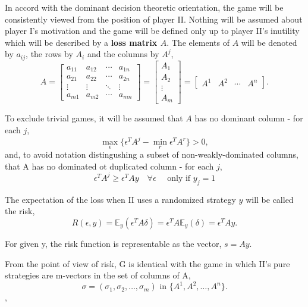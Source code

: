 \documentclass[11pt]{article}
\theoremstyle{boldStyle}
\begin{document}
In accord with the dominant decision theoretic orientation, the game will be consistently viewed from the position of player II. 
Nothing will be assumed about player I's motivation and the game will be defined only up to player II's inutility which will be described by a \textbf{loss matrix $A$}. 
The elements of $A$ will be denoted by $a_{ij}$, the rows by $A_i$ and the columns by $A^j$,
\begin{equation} \label{eq:3}
    A = \begin{bmatrix}
    a_{11} & a_{12} & \cdots & a_{1n} \\
    a_{21} & a_{22} & \cdots & a_{2n} \\
    \vdots & \vdots & \ddots & \vdots \\
    a_{m1} & a_{m2} & \cdots & a_{mn}
    \end{bmatrix} = \begin{bmatrix} A_1 \\ A_2 \\ \vdots \\ A_m \end{bmatrix} = \begin{bmatrix} A^1 & A^2 & \cdots & A^n \end{bmatrix}.
\end{equation}

To exclude trivial games, it will be assumed that $A$ has no dominant column - for each $j$,
\begin{equation} \label{eq:4}
    \max_{\epsilon} \{ \epsilon^T A^j - \min_{r} \epsilon^T A^r \} > 0,
\end{equation}
and, to avoid notation distingushing a subset of non-weakly-dominated columns, that A has no dominated ot duplicated column - for each $j$,
\begin{equation} \label{eq:5}
    \epsilon^T A^j \geq \epsilon^T Ay \quad \forall \epsilon \quad \text{ only if } y_j = 1
\end{equation}

\bigbreak

The expectation of the loss when II uses a randomized strategy \( y \) will be called the risk,
\[
    R(\epsilon, y) = \mathbb{E}_y(\epsilon^T A \delta) = \epsilon^T A \mathbb{E}_y(\delta) = \epsilon^T A y.
\]

For given y, the risk function is representable as the vector, $s = Ay$.

From the point of view of risk, G is identical with the game in which II's pure strategies are m-vectors in the set of columns of A, 
\begin{equation} \label{eq:6}
    \sigma = (\sigma_1, \sigma_2, \ldots, \sigma_m) \text{ in } \{A^1, A^2, \ldots, A^n\}.
\end{equation},
\end{document}
